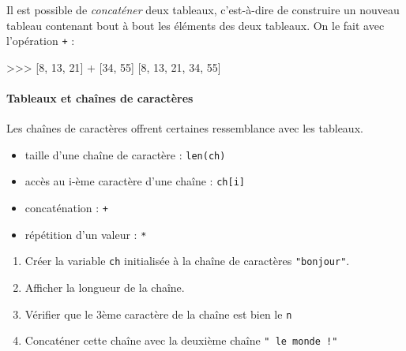 \documentclass[a4paper,17pt]{extarticle}
\providecommand{\tightlist}{%
      \setlength{\itemsep}{0pt}\setlength{\parskip}{0pt}}
\newenvironment{Shaded}{}{}
\newcommand{\DecValTok}[1]{\textcolor[rgb]{0.25,0.63,0.44}{{#1}}}
\newcommand{\NormalTok}[1]{{#1}}
\newcommand{\OperatorTok}[1]{\textcolor[rgb]{0.40,0.40,0.40}{{#1}}}
\begin{document}
    Il est possible de \emph{concaténer} deux tableaux, c'est-à-dire de
construire un nouveau tableau contenant bout à bout les éléments des
deux tableaux. On le fait avec l'opération \texttt{+} :

\begin{Shaded}
\begin{Highlighting}[]
\OperatorTok{\textgreater{}\textgreater{}\textgreater{}}\NormalTok{ [}\DecValTok{8}\NormalTok{, }\DecValTok{13}\NormalTok{, }\DecValTok{21}\NormalTok{] }\OperatorTok{+}\NormalTok{ [}\DecValTok{34}\NormalTok{, }\DecValTok{55}\NormalTok{]}
\NormalTok{[}\DecValTok{8}\NormalTok{, }\DecValTok{13}\NormalTok{, }\DecValTok{21}\NormalTok{, }\DecValTok{34}\NormalTok{, }\DecValTok{55}\NormalTok{]}
\end{Highlighting}
\end{Shaded}

    \hypertarget{tableaux-et-chauxeenes-de-caractuxe8res}{%
\paragraph{Tableaux et chaînes de
caractères}\label{tableaux-et-chauxeenes-de-caractuxe8res}}

    Les chaînes de caractères offrent certaines ressemblance avec les
tableaux.

\begin{itemize}
\tightlist
\item
  taille d'une chaîne de caractère : \texttt{len(ch)}
\item
  accès au i-ème caractère d'une chaîne : \texttt{ch{[}i{]}}
\item
  concaténation : \texttt{+}
\item
  répétition d'un valeur : \texttt{*}
\end{itemize}

    \begin{enumerate}
\def\labelenumi{\arabic{enumi}.}
\tightlist
\item
  Créer la variable \texttt{ch} initialisée à la chaîne de caractères
  \texttt{"bonjour"}.
\item
  Afficher la longueur de la chaîne.
\item
  Vérifier que le 3ème caractère de la chaîne est bien le \texttt{n}
\item
  Concaténer cette chaîne avec la deuxième chaîne
  \texttt{"\ le\ monde\ !"}
\end{enumerate}
\end{document}
